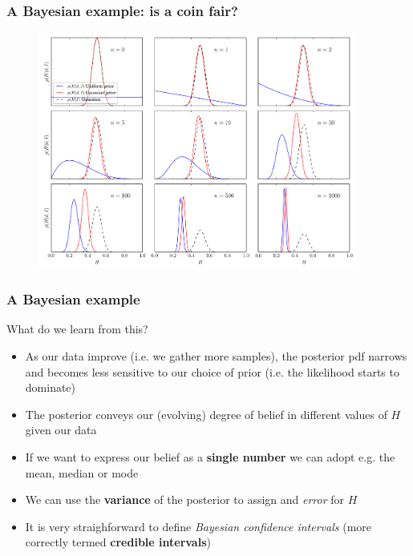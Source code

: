 \begin{frame}

\frametitle{A Bayesian example: is a coin fair?}
\label{abayesianexample:isacoinfair}

\begin{figure}[htbp]
\centering
\includegraphics[keepaspectratio,width=\textwidth,height=220pt]{figures/coin_toss_2.pdf}
\label{coin_toss_2}
\end{figure}

\end{frame}

\begin{frame}

\frametitle{A Bayesian example}
\label{abayesianexample}


What do we learn from this?

\begin{itemize}
\item As our data improve (i.e. we gather more samples), the posterior pdf narrows and becomes
less sensitive to our choice of prior (i.e. the likelihood starts to dominate)

\item The posterior conveys our (evolving) degree of belief in different values of $H$ given our
data

\item If we want to express our belief as a \textbf{single number} we can adopt e.g. the mean, median or mode

\item We can use the \textbf{variance} of the posterior to assign and \emph{error} for $H$

\item It is very straighforward to define \emph{Bayesian confidence intervals} (more correctly termed
\textbf{credible intervals})

\end{itemize}

\end{frame}

